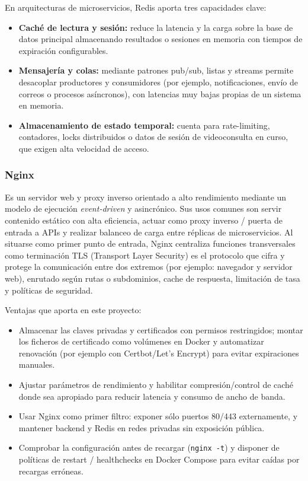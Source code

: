 \documentclass[12pt, a4paper]{article}
\begin{document}
En arquitecturas de microservicios, Redis aporta tres capacidades clave:
\begin{itemize}
	\item \textbf{Caché de lectura y sesión:} reduce la latencia y la carga sobre la base de datos principal almacenando resultados o sesiones en memoria con tiempos de expiración configurables.
	\item \textbf{Mensajería y colas:} mediante patrones pub/sub, listas y streams permite desacoplar productores y consumidores (por ejemplo, notificaciones, envío de correos o procesos asíncronos), con latencias muy bajas propias de un sistema en memoria. \cite{redis_pubsub,redis_streams}
	\item \textbf{Almacenamiento de estado temporal:} cuenta para rate-limiting, contadores, locks distribuidos o datos de sesión de videoconsulta en curso, que exigen alta velocidad de acceso.
\end{itemize}


\subsubsection{Nginx}
 Es un servidor web y proxy inverso orientado a alto rendimiento mediante un modelo de ejecución \emph{event-driven} y asincrónico. Sus usos comunes son servir contenido estático con alta eficiencia, actuar como proxy inverso / puerta de entrada a APIs y realizar balanceo de carga entre réplicas de microservicios. Al situarse como primer punto de entrada, Nginx centraliza funciones transversales como terminación TLS (Transport Layer Security) es el protocolo que cifra y protege la comunicación entre dos extremos (por ejemplo: navegador y servidor web), enrutado según rutas o subdominios, cache de respuesta, limitación de tasa y políticas de seguridad.\cite{nginx_reverseproxy,nginx_docs}


Ventajas que aporta en este proyecto:
\begin{itemize}
	\item Almacenar las claves privadas y certificados con permisos restringidos; montar los ficheros de certificado como volúmenes en Docker y automatizar renovación (por ejemplo con Certbot/Let's Encrypt) para evitar expiraciones manuales. \cite{certbot_doc}
	\item Ajustar parámetros de rendimiento y habilitar compresión/control de caché donde sea apropiado para reducir latencia y consumo de ancho de banda.
	\item Usar Nginx como primer filtro: exponer sólo puertos 80/443 externamente, y mantener backend y Redis en redes privadas sin exposición pública.
	\item Comprobar la configuración antes de recargar (\texttt{nginx -t}) y disponer de políticas de restart / healthchecks en Docker Compose para evitar caídas por recargas erróneas.
\end{itemize}
\end{document}
